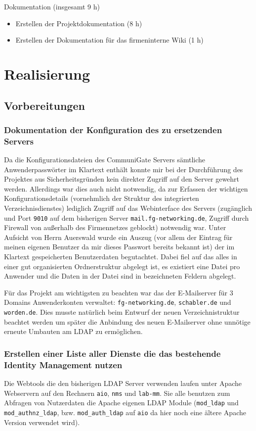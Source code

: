 \documentclass[11pt,a4paper,titlepage=firstiscover]{scrartcl} %
\begin{document}
Dokumentation (insgesamt 9 h)
	\begin{itemize}
	\item Erstellen der Projektdokumentation (8 h)
	\item Erstellen der Dokumentation für das firmeninterne Wiki (1 h)
	\end{itemize}

\section{Realisierung}
\subsection{Vorbereitungen}
\subsubsection{Dokumentation der Konfiguration des zu ersetzenden Servers}\label{sec:Konfig-Doku-Alt}
Da die Konfigurationsdateien des CommuniGate Servers sämtliche Anwenderpasswörter im Klartext enthält konnte mir bei der Durchführung des Projektes aus Sicherheitsgründen kein direkter Zugriff auf den Server gewehrt werden. Allerdings war dies auch nicht notwendig, da zur Erfassen der wichtigen Konfigurationsdetails (vornehmlich der Struktur des integrierten Verzeichnisdienstes) lediglich Zugriff auf das Webinterface des Servers (zugänglich und Port \texttt{9010} auf dem bisherigen Server \texttt{mail.fg-networking.de}, Zugriff durch Firewall von au\ss{}erhalb des Firmennetzes geblockt) notwendig war. Unter Aufsicht von Herrn Auerswald wurde ein Auszug (vor allem der Eintrag für meinen eigenen Benutzer da mir dieses Passwort bereits bekannt ist) der im Klartext gespeicherten Benutzerdaten begutachtet. Dabei fiel auf das alles in einer gut organisierten Ordnerstruktur abgelegt ist, es existiert eine Datei pro Anwender und die Daten in der Datei sind in bezeichneten Feldern abgelegt.

Für das Projekt am wichtigsten zu beachten war das der E-Mailserver für 3 Domains Anwenderkonten verwaltet: \texttt{fg-networking.de}, \texttt{schabler.de} und \texttt{worden.de}. Dies musste natürlich beim Entwurf der neuen Verzeichnistruktur beachtet werden um später die Anbindung des neuen E-Mailserver ohne unnötige erneute Umbauten am LDAP zu ermöglichen.

\subsubsection{Erstellen einer Liste aller Dienste die das bestehende Identity Management nutzen}
Die Webtools die den bisherigen LDAP Server verwenden laufen unter Apache Webservern auf den Rechnern \texttt{aio}, \texttt{nms} und \texttt{lab-mm}. Sie alle benutzen zum Abfragen von Nutzerdaten die Apache eigenen LDAP Module (\texttt{mod\_ldap} und \texttt{mod\_authnz\_ldap}, bzw. \texttt{mod\_auth\_ldap} auf \texttt{aio} da hier noch eine ältere Apache Version verwendet wird). 
\end{document}
